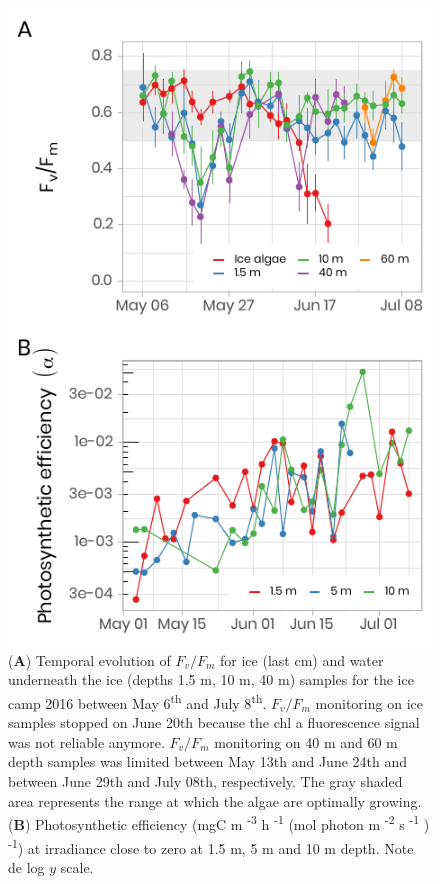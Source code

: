 \documentclass[12pt,a4paper]{scrartcl}
\begin{document}
\clearpage
\newpage

\begin{figure}[h]
	\centering
	\includegraphics[scale = 1]{../../../graphs/fig13.pdf}
	\caption{(\textbf{A}) Temporal evolution of $F_v/F_m$ for ice (last cm) and water underneath the ice (depths 1.5 m, 10 m, 40 m) samples for the ice camp 2016 between May 6\textsuperscript{th} and July 8\textsuperscript{th}. $F_v/F_m$ monitoring on ice samples stopped on June 20th because the chl a fluorescence signal was not reliable anymore. $F_v/F_m$ monitoring on 40 m and 60 m depth samples was limited between May 13th and June 24th and between June 29th and July 08th, respectively. The gray shaded area represents the range at which the algae are optimally growing. (\textbf{B}) Photosynthetic efficiency (mgC m \textsuperscript{-3} h \textsuperscript{-1} (\textmu{}mol photon m \textsuperscript{-2} s \textsuperscript{-1} ) \textsuperscript{-1}) at irradiance close to zero at 1.5 m, 5 m and 10 m depth. Note de log $y$ scale.}
\end{figure}
\end{document}

